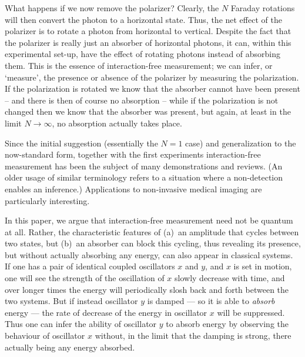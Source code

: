 \documentclass[prb,preprint]{revtex4-1}
\begin{document}
What happens if we now remove the polarizer?  Clearly, the $N$ Faraday
rotations will then convert the photon to a horizontal state.  Thus,
the net effect of the polarizer is to rotate a photon from horizontal
to vertical.  Despite the fact that the polarizer is really just an
absorber of horizontal photons, it can, within this experimental
set-up, have the effect of rotating photons instead of absorbing them.
This is the essence of interaction-free measurement; we can infer, or
`measure', the presence or absence of the polarizer by measuring the
polarization.  If the polarization is rotated we know that the
absorber cannot have been present -- and there is then of course no
absorption -- while if the polarization is not changed then we know
that the absorber was present, but again, at least in the limit $N
\rightarrow \infty$, no absorption actually takes place.

Since the initial suggestion (essentially the $N=1$
case)\cite{1993FoPh...23..987E} and generalization to the now-standard
form, together with the first experiments\cite{PhysRevLett.74.4763}
interaction-free measurement has been the subject of many
demonstrations\cite{PhysRevA.57.3987,voorthuysen:1504,2006JPhB...39.3177N}
and reviews.\cite{deweerd:272} (An older usage of similar
terminology\cite{springerlink:10.1007/BF01327019,dicke:925} refers to
a situation where a non-detection enables an inference.)  Applications
to non-invasive medical imaging\cite{PhysRevA.80.040902} are
particularly interesting.

In this paper, we argue that interaction-free measurement need not be
quantum at all.  Rather, the characteristic features of (a)~an
amplitude that cycles between two states, but (b)~an absorber can
block this cycling, thus revealing its presence, but without actually
absorbing any energy, can also appear in classical systems.  If one
has a pair of identical coupled oscillators $x$ and $y$, and $x$ is
set in motion, one will see the strength of the oscillation of $x$
slowly decrease with time, and over longer times the energy will
periodically slosh back and forth between the two systems.  But if
instead oscillator $y$ is damped --- so it is able to {\em absorb\/}
energy --- the rate of decrease of the energy in oscillator $x$ will
be suppressed.  Thus one can infer the ability of oscillator $y$ to
absorb energy by observing the behaviour of oscillator $x$ without, in
the limit that the damping is strong, there actually being any energy
absorbed.
\end{document}
